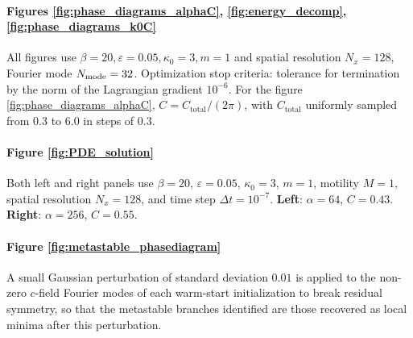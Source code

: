 \documentclass[
aip,
jcp,
reprint, 
floatfix
]{revtex4-1}
\begin{document}
\paragraph{Figures  \ref{fig:phase_diagrams_alphaC},  \ref{fig:energy_decomp},  \ref{fig:phase_diagrams_k0C}}
All figures use $\beta=20, \varepsilon=0.05, \kappa_0=3, m=1$ and 
spatial resolution $N_x = 128$, Fourier mode $N_{\rm mode}=32$.
Optimization stop criteria: tolerance for termination by the norm of the Lagrangian gradient $10^{-6}$.
For the figure  \ref{fig:phase_diagrams_alphaC}, $C = C_{\mathrm{total}}/(2\pi)$, with $C_{\mathrm{total}}$ uniformly sampled from $0.3$ to $6.0$ in steps of $0.3$.

\paragraph{Figure \ref{fig:PDE_solution}}
Both left and right panels use $\beta=20$, $\varepsilon=0.05$, $\kappa_0=3$, $m=1$, motility $M=1$, spatial resolution $N_x=128$, and time step $\Delta t=10^{-7}$.
\textbf{Left}: $\alpha=64$, $C=0.43$.
\textbf{Right}: $\alpha=256$, $C=0.55$.


\paragraph{Figure \ref{fig:metastable_phasediagram}}
A small Gaussian perturbation of standard deviation $0.01$ is applied to the non-zero $c$-field Fourier modes of each warm-start initialization to break residual symmetry, so that the metastable branches identified are those recovered as local minima after this perturbation.
\end{document}
